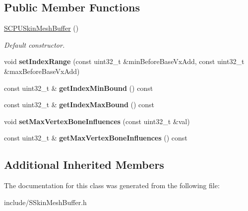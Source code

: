 \subsection*{Public Member Functions}
\begin{DoxyCompactItemize}
\item 
\hyperlink{classirr_1_1scene_1_1SCPUSkinMeshBuffer_a9a7f8ae83b89290698df4492d2c34cf9}{S\+C\+P\+U\+Skin\+Mesh\+Buffer} ()\hypertarget{classirr_1_1scene_1_1SCPUSkinMeshBuffer_a9a7f8ae83b89290698df4492d2c34cf9}{}\label{classirr_1_1scene_1_1SCPUSkinMeshBuffer_a9a7f8ae83b89290698df4492d2c34cf9}

\begin{DoxyCompactList}\small\item\em Default constructor. \end{DoxyCompactList}\item 
void {\bfseries set\+Index\+Range} (const uint32\+\_\+t \&min\+Before\+Base\+Vx\+Add, const uint32\+\_\+t \&max\+Before\+Base\+Vx\+Add)\hypertarget{classirr_1_1scene_1_1SCPUSkinMeshBuffer_a7f90195cd9ba52522c998238f12b2ee2}{}\label{classirr_1_1scene_1_1SCPUSkinMeshBuffer_a7f90195cd9ba52522c998238f12b2ee2}

\item 
const uint32\+\_\+t \& {\bfseries get\+Index\+Min\+Bound} () const \hypertarget{classirr_1_1scene_1_1SCPUSkinMeshBuffer_a54cc7ba9677f1993fdc9653424cd9d32}{}\label{classirr_1_1scene_1_1SCPUSkinMeshBuffer_a54cc7ba9677f1993fdc9653424cd9d32}

\item 
const uint32\+\_\+t \& {\bfseries get\+Index\+Max\+Bound} () const \hypertarget{classirr_1_1scene_1_1SCPUSkinMeshBuffer_a771b4365cd60740a662ccb0dcd6ae9ca}{}\label{classirr_1_1scene_1_1SCPUSkinMeshBuffer_a771b4365cd60740a662ccb0dcd6ae9ca}

\item 
void {\bfseries set\+Max\+Vertex\+Bone\+Influences} (const uint32\+\_\+t \&val)\hypertarget{classirr_1_1scene_1_1SCPUSkinMeshBuffer_abe58c1340ae6d19c603a51c54c072370}{}\label{classirr_1_1scene_1_1SCPUSkinMeshBuffer_abe58c1340ae6d19c603a51c54c072370}

\item 
const uint32\+\_\+t \& {\bfseries get\+Max\+Vertex\+Bone\+Influences} () const \hypertarget{classirr_1_1scene_1_1SCPUSkinMeshBuffer_a746156225b1fb04bdfc8c3bf75801cd7}{}\label{classirr_1_1scene_1_1SCPUSkinMeshBuffer_a746156225b1fb04bdfc8c3bf75801cd7}

\end{DoxyCompactItemize}
\subsection*{Additional Inherited Members}


The documentation for this class was generated from the following file\+:\begin{DoxyCompactItemize}
\item 
include/S\+Skin\+Mesh\+Buffer.\+h\end{DoxyCompactItemize}
